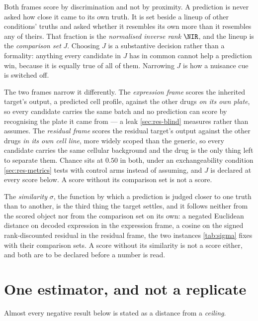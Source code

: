 Both frames score by discrimination and not by proximity. A prediction is never
asked how close it came to its own truth. It is set beside a lineup of other
conditions' truths and asked whether it resembles its own more than it resembles
any of theirs. That fraction is the \emph{normalised inverse rank}
$\NIR$, and the lineup is the \emph{comparison set} $J$.
Choosing $J$ is a substantive decision rather than a formality: anything every
candidate in $J$ has in common cannot help a prediction win, because it is
equally true of all of them. Narrowing $J$ is how a nuisance cue is switched off.

The two frames narrow it differently. The \Eframe{} \emph{expression frame}
scores the inherited target's output, a predicted cell profile, against the other
drugs \emph{on its own plate}, so every candidate carries the same batch and no
prediction can score by recognising the plate it came from --- a leak
\cref{sec:res-blind} measures rather than assumes. The \Rframe{} \emph{residual
frame} scores the residual target's output against the other drugs \emph{in its
own cell line}, more widely scoped than the generic, so every candidate carries
the same cellular background and the drug is the only thing left to separate
them. Chance sits at $0.50$ in both, under an exchangeability condition
\cref{sec:res-metrics} tests with control arms instead of assuming, and $J$ is
declared at every score below. A score without its comparison set is not a score.

The \emph{similarity} $\sigma$, the function by which a prediction is judged
closer to one truth than to another, is the third thing the target settles, and
it follows neither from the scored object nor from the comparison set on its own:
a negated Euclidean distance on decoded expression in the expression frame, a
cosine on the signed rank-discounted residual in the residual frame, the two
instances \cref{tab:sigma} fixes with their comparison sets. A score without its
similarity is not a score either, and both are to be declared before a number is
read.



\section{One estimator, and not a replicate}

Almost every negative result below is stated as a distance from a
\emph{ceiling}. 

